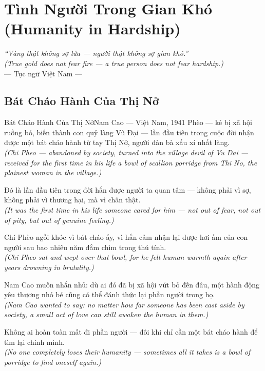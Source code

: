 \chapter{Tình Người Trong Gian Khó (Humanity in Hardship)}
\begin{center}
  \textit{\color{truyengold}``Vàng thật không sợ lửa --- người thật không sợ gian khó.''}\\[4pt]
  \textit{(True gold does not fear fire --- a true person does not fear hardship.)}\\[4pt]
  \small\color{truyenblue}--- Tục ngữ Việt Nam ---
\end{center}
\ngancach

\section{Bát Cháo Hành Của Thị Nở}
\begin{truyen}{Bát Cháo Hành Của Thị Nở}{Nam Cao --- Việt Nam, 1941}
 Phèo --- kẻ bị xã hội ruồng bỏ, biến thành con quỷ làng Vũ Đại --- lần đầu tiên trong cuộc đời nhận được một bát cháo hành từ tay Thị Nở, người đàn bà xấu xí nhất làng.\\[4pt]
\textit{(Chi Pheo --- abandoned by society, turned into the village devil of Vu Dai --- received for the first time in his life a bowl of scallion porridge from Thi No, the plainest woman in the village.)}

Đó là lần đầu tiên trong đời hắn được người ta quan tâm --- không phải vì sợ, không phải vì thương hại, mà vì chân thật.\\[4pt]
\textit{(It was the first time in his life someone cared for him --- not out of fear, not out of pity, but out of genuine feeling.)}

Chí Phèo ngồi khóc vì bát cháo ấy, vì hắn cảm nhận lại được hơi ấm của con người sau bao nhiêu năm đắm chìm trong thú tính.\\[4pt]
\textit{(Chi Pheo sat and wept over that bowl, for he felt human warmth again after years drowning in brutality.)}

Nam Cao muốn nhắn nhủ: dù ai đó đã bị xã hội vứt bỏ đến đâu, một hành động yêu thương nhỏ bé cũng có thể đánh thức lại phần người trong họ.\\[4pt]
\textit{(Nam Cao wanted to say: no matter how far someone has been cast aside by society, a small act of love can still awaken the human in them.)}

\end{truyen}
\begin{baihoc}
  Không ai hoàn toàn mất đi phần người --- đôi khi chỉ cần một bát cháo hành để tìm lại chính mình.\\[4pt]
  \textit{(No one completely loses their humanity --- sometimes all it takes is a bowl of porridge to find oneself again.)}
\end{baihoc}

